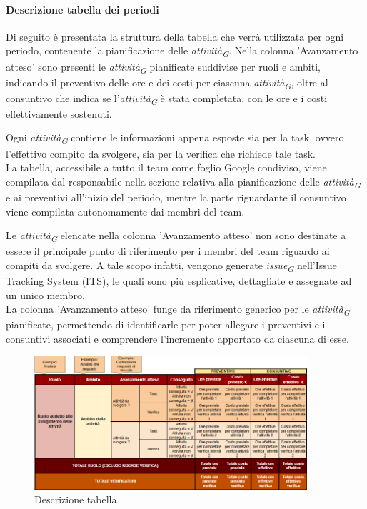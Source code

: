 \paragraph{Descrizione tabella dei periodi}\label{sec:DescrTabella}

Di seguito è presentata la struttura della tabella che verrà utilizzata per ogni periodo, contenente la pianificazione delle \textit{attività}\textsubscript{\textit{G}}. Nella colonna 'Avanzamento atteso' sono presenti le \textit{attività}\textsubscript{\textit{G}} pianificate suddivise per ruoli e ambiti, indicando il preventivo delle ore e dei costi per ciascuna \textit{attività}\textsubscript{\textit{G}}, oltre al consuntivo che indica se l'\textit{attività}\textsubscript{\textit{G}} è stata completata, con le ore e i costi effettivamente sostenuti.

\vspace{0.2cm}

Ogni \textit{attività}\textsubscript{\textit{G}} contiene le informazioni appena esposte sia per la task, ovvero l'effettivo compito da svolgere,  sia per la verifica che richiede tale task. \\
La tabella, accessibile a tutto il team come foglio Google condiviso, viene compilata dal responsabile nella sezione relativa alla pianificazione delle \textit{attività}\textsubscript{\textit{G}} e ai preventivi all'inizio del periodo, mentre la parte riguardante il consuntivo viene compilata autonomamente dai membri del team.

\vspace{0.2cm}

Le \textit{attività}\textsubscript{\textit{G}} elencate nella colonna 'Avanzamento atteso' non sono destinate a essere il principale punto di riferimento per i membri del team riguardo ai compiti da svolgere. A tale scopo infatti, vengono generate \textit{issue}\textsubscript{\textit{G}} nell'Issue Tracking System (ITS), le quali sono più esplicative, dettagliate e assegnate ad un unico membro. \\
La colonna 'Avanzamento atteso' funge da riferimento generico per le \textit{attività}\textsubscript{\textit{G}} pianificate, permettendo di identificarle per poter allegare i preventivi e i consuntivi associati e comprendere l'incremento apportato da ciascuna di esse.

\vspace{0.5cm}

\begin{figure}[H]
    \centering
    \includegraphics[width=0.9\textwidth]{../Images/spiegazioneTabella.png}
    \caption{Descrizione tabella} 
    \label{fig:spiegazioneTabella} 
\end{figure}